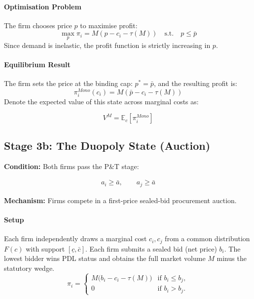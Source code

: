 \documentclass[12pt]{article}
\begin{document}
\paragraph{Optimisation Problem}
The firm chooses price $p$ to maximise profit:
\begin{equation}
    \max_{p} \pi_i = M(p - c_i - \tau(M)) \quad \text{s.t.} \quad p \le \bar{p}
\end{equation}
Since demand is inelastic, the profit function is strictly increasing in $p$.

\paragraph{Equilibrium Result}
The firm sets the price at the binding cap: $p^* = \bar{p}$, and the resulting profit is:
\begin{equation} \label{eq:mono_profit}
    \pi_i^{Mono}(c_i) = M(\bar{p} - c_i - \tau(M))
\end{equation}
Denote the expected value of this state across marginal costs as: 

\begin{equation}
V^M = \mathbb{E}_c[\pi_i^{Mono}]
\end{equation}

\subsection{Stage 3b: The Duopoly State (Auction)}
\textbf{Condition:} Both firms pass the P\&T stage:

\begin{align*}
    a_i \geq \bar{a}, \qquad a_j \geq \bar{a}
\end{align*}

\textbf{Mechanism:} Firms compete in a first-price sealed-bid procurement auction.

\paragraph{Setup}
Each firm independently draws a marginal cost $c_i, c_j$ from a common distribution $F(c)$ with support $[\underline{c}, \bar{c}]$. Each firm submits a sealed bid (net price) $b_i$. The lowest bidder wins PDL status and obtains the full market volume $M$ minus the statutory wedge.
\[
\pi_i =
\begin{cases}
M\big(b_i - c_i - \tau(M)\big) & \text{if } b_i \leq b_j, \\
0 & \text{if } b_i > b_j.
\end{cases}
\]
\end{document}
